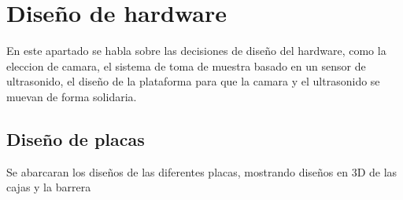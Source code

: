 \section{Diseño de hardware}

En este apartado se habla sobre las decisiones de diseño del hardware, como la eleccion de camara, el sistema de toma de muestra basado en un sensor de ultrasonido, 
el diseño de la plataforma para que la camara y el ultrasonido se muevan de forma solidaria. 

\subsection{Diseño de placas}

Se abarcaran los diseños de las diferentes placas, mostrando diseños en 3D de las cajas y la barrera

\subsection{}